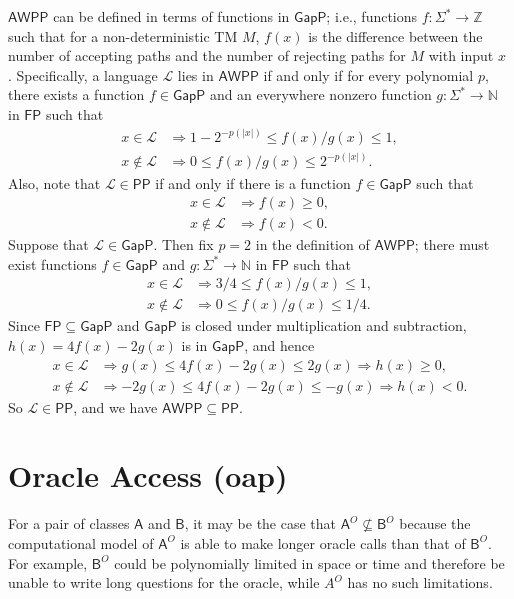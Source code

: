 \documentclass[12pt]{article}
\theoremstyle{definition}
\theoremstyle{remark}
\newcommand{\N}{\mathbb{N}}
\newcommand{\Z}{\mathbb{Z}}
\newcommand{\ra}{\rightarrow}
\newcommand{\cL}{\mathcal{L}}
\newcommand{\A}{\mathsf{A}}
\newcommand{\msf}[1]{\mathsf{#1}}
\begin{document}
$\msf{AWPP}$ can be defined in terms of functions in $\msf{GapP}$; i.e.,
functions $f:\Sigma^*\ra\Z$ such that for a non-deterministic TM $M$, $f(x)$ is
the difference between the number of accepting paths and the number of rejecting
paths for $M$ with input $x$ \cite{fenner1994gap}. Specifically, a language
$\cL$ lies in $\msf{AWPP}$ if and only if for every polynomial $p$, there exists
a function $f\in\msf{GapP}$ and an everywhere nonzero function $g:\Sigma^*\ra\N$
in $\msf{FP}$ such that
\begin{align*}
x\in\cL&\Longrightarrow 1-2^{-p(|x|)}\leq f(x)/g(x)\leq 1, \\
x\notin\cL&\Longrightarrow 0\leq f(x)/g(x)\leq 2^{-p(|x|)}.
\end{align*}
Also, note that $\mathcal{L}\in\msf{PP}$ if and only if there is a function
$f\in\msf{GapP}$ such that
\begin{align*}
x\in\cL&\Longrightarrow f(x)\geq 0, \\
x\notin\cL&\Longrightarrow f(x)<0.
\end{align*}
Suppose that $\cL\in\msf{GapP}$. Then fix $p=2$ in the definition of
$\msf{AWPP}$; there must exist functions $f\in\msf{GapP}$ and $g:\Sigma^*\ra\N$
in $\msf{FP}$ such that
\begin{align*}
x\in\cL&\Longrightarrow 3/4\leq f(x)/g(x)\leq 1, \\
x\notin\cL&\Longrightarrow 0\leq f(x)/g(x)\leq 1/4.
\end{align*}
Since $\msf{FP}\subseteq\msf{GapP}$ and $\msf{GapP}$ is closed under
multiplication and subtraction, $h(x)=4f(x)-2g(x)$ is in $\msf{GapP}$, and hence
\begin{align*}
x\in\cL&\Longrightarrow g(x)\leq 4f(x)-2g(x)\leq 2g(x)
\Longrightarrow h(x)\geq 0, \\
x\notin\cL&\Longrightarrow -2g(x)\leq 4f(x)-2g(x)\leq-g(x)
\Longrightarrow h(x)< 0.
\end{align*}
So $\cL\in\msf{PP}$, and we have $\msf{AWPP}\subseteq\msf{PP}$.

\section{Oracle Access (oap)}

For a pair of classes $\A$ and $\msf{B}$, it may be the case that
$\A^O\not\subseteq\msf{B}^O$ because the computational model of $\A^O$ is able
to make longer oracle calls than that of $\msf{B}^O$. For example, $\msf{B}^O$
could be polynomially limited in space or time and therefore be unable to write
long questions for the oracle, while $A^O$ has no such limitations.
\end{document}
